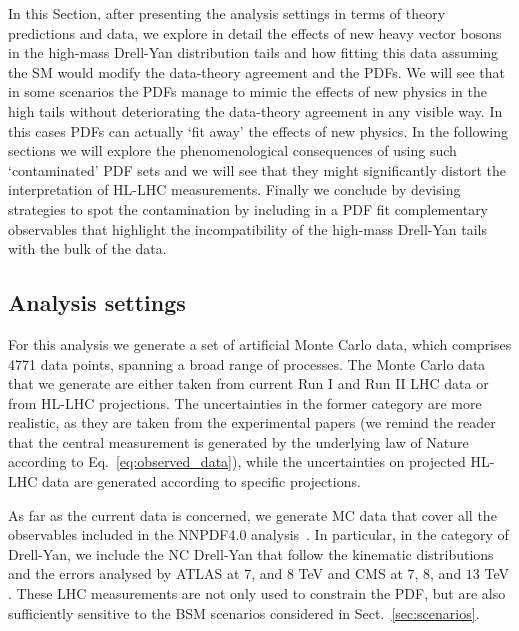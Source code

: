 \documentclass[withindex,glossary]{cam-thesis}
\begin{document}
In this Section, after presenting the analysis settings in terms of
theory predictions and data, we explore in detail the effects of new
heavy vector  bosons in the high-mass Drell-Yan distribution tails and how fitting
this data assuming the SM would modify the data-theory agreement and
the PDFs. We will see that in some scenarios the PDFs manage to mimic
the effects of new physics in the high tails without deteriorating the
data-theory agreement in any visible way. In this cases PDFs can
actually `fit away' the effects of new physics. In the following
sections we will explore the phenomenological consequences of using
such `contaminated' PDF sets and we will see that they might
significantly distort the interpretation of HL-LHC measurements. Finally
we conclude by devising strategies to spot the contamination by
including in a PDF fit complementary observables that highlight the
incompatibility of the high-mass Drell-Yan tails with the bulk of the
data.

\subsection{Analysis settings}

For this analysis we generate a set of artificial  Monte Carlo data, which comprises 4771 data points,
spanning a broad range of processes.
%
The Monte Carlo data that we generate are either taken from current Run I and
Run II LHC data or from HL-LHC projections. The uncertainties in the
former category are more realistic, as they are taken from the
experimental papers (we remind the reader that the central
measurement is generated by the underlying law of Nature according to Eq.~\eqref{eq:observed_data}), 
while the uncertainties on projected HL-LHC data are generated according to specific projections. 

As far as the current data is concerned, we generate MC data that
cover all the observables included in the NNPDF4.0 analysis~\cite{Ball:2021leu}. 
In particular, in the category of Drell-Yan, we
include the NC Drell-Yan that follow the kinematic
distributions and the errors analysed by ATLAS at \(7\), and \(8\) TeV \cite{ATLAS:2013xny, ATLAS:2016gic} and
CMS at \(7\), \(8\), and \(13\) TeV \cite{CMS:2013zfg, CMS:2014jea,
  CMS:2018mdl}. These LHC measurements are not only used to constrain the PDF, but are also
sufficiently sensitive to the BSM scenarios considered in Sect.~\ref{sec:scenarios}.
\end{document}
